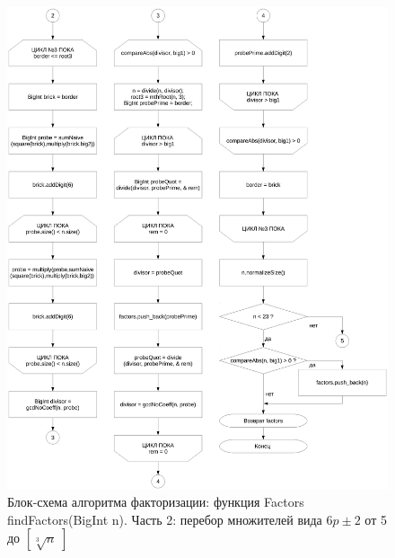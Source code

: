\documentclass[a4paper,12pt]{article} %
\begin{document}
\begin{figure}[ht]
	\centering
	\includegraphics[width=\textwidth]{lr7_findFactors-2.pdf}
	\caption{
		Блок-схема алгоритма факторизации: функция Factors findFactors(BigInt n).
		Часть 2: перебор множителей вида $6p\pm2$ от 5 до $[\sqrt[3]{n}\;]$
	}
\end{figure}
\end{document}
